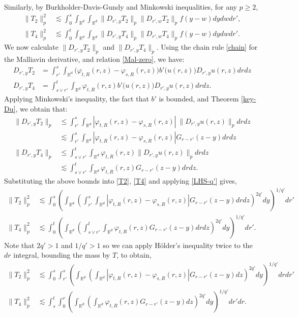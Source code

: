\documentclass[12pt]{article}
\def\bR{\mathbb{R}}
\newcommand{\les}{\lesssim}
\begin{document}
Similarly, by Burkholder-Davis-Gundy and Minkowski inequalities, for any $p\geq 2$,
\begin{align}
\label{T2}
\|T_2\|^2_p & \les \int_0^s \int_{\bR^d} \int_{\bR^d} \|D_{r',y} T_2\|_{p} \|D_{r',w} T_2\|_{p} f(y-w) dy dw dr', \\
\label{T4}
\|T_4\|^2_p & \les \int_0^t \int_{\bR^d} \int_{\bR^d} \|D_{r',y} T_4\|_{p} \|D_{r',w} T_4\|_{p} f(y-w) dy dw dr'. 
\end{align}
We now calculate $\|D_{r',y} T_2\|_{p}$ and $\|D_{r',y} T_4\|_{p}$. Using the chain rule \eqref{chain} for the Malliavin derivative, and relation \eqref{Mal-zero}, we have:
\begin{align*}
D_{r',y}T_2 &= \int_{r'}^s \int_{\bR^d}  \Big( \varphi_{t,R}(r,z) - \varphi_{s,R}(r,z) \Big) b'\big(u(r,z)\big) D_{r',y}u(r,z) drdz\\
D_{r',y}T_4&=\int_{s \vee r'}^t   \int_{\bR^d}  \varphi_{t,R}(r,z)  b'\big(u(r,z)\big) D_{r',y}u(r,z) drdz.
\end{align*}
Applying Minkowski's inequality, the fact that $b'$ is bounded, and Theorem \ref{key-Du}, we obtain that:
\begin{align*}
\|D_{r',y}T_2\|_{p} &\leq \int_{r'}^s \int_{\bR^d}  \left| \varphi_{t,R}(r,z) - \varphi_{s,R}(r,z) \right| \ \|D_{r',y}u(r,z)\|_{p}  drdz\\
&\les \int_{r'}^s  \int_{\bR^d}  \left| \varphi_{t,R}(r,z) - \varphi_{s,R}(r,z) \right| G_{r-r'}(z-y)  drdz\\
\|D_{r',y}T_4\|_p &\leq  \int_{s \vee r'}^t  \int_{\bR^d}  \varphi_{t,R}(r,z) \|D_{r',y}u(r,z)\|_{p} drdz \\
 &\les \int_{s \vee r'}^t \int_{\bR^d}  \varphi_{t,R}(r,z) G_{r-r'}(z-y) drdz. 
\end{align*}
Substituting the above bounds into \eqref{T2}, \eqref{T4} and applying \eqref{LHS-q'} gives, 
\begin{align*}
\|T_2\|^2_p & \les \int_0^s \left(\int_{\bR^d} \left( \int_{r'}^s \int_{\bR^d}  \left| \varphi_{t,R}(r,z) - \varphi_{s,R}(r,z) \right| G_{r-r'}(z-y)  drdz \right)^{2q'}  dy \right)^{1/q'}dr' \\
\|T_4\|^2_p & \les \int_0^t \left(\int_{\bR^d} \left( \int_{s \vee r'}^t \int_{\bR^d}  \varphi_{t,R}(r,z) G_{r-r'}(z-y)  drdz \right)^{2q'}  dy \right)^{1/q'}dr'.
\end{align*}
Note that $2q' > 1$ and $1/q' > 1$ so we can apply H\"older's inequality twice to the $dr$ integral, bounding the mass by $T$, to obtain, 
\begin{align*}
\|T_2\|^2_p & \les \int_0^s \int_{r'}^s \left(\int_{\bR^d} \left( \int_{\bR^d}  \left| \varphi_{t,R}(r,z) - \varphi_{s,R}(r,z) \right| G_{r-r'}(z-y)  dz \right)^{2q'}  dy \right)^{1/q'}drdr' \\
\|T_4\|^2_p & \les \int_s^t \int_{0}^r \left(\int_{\bR^d} \left(  \int_{\bR^d}   \varphi_{t,R}(r,z) G_{r-r'}(z-y)  dz \right)^{2q'}  dy \right)^{1/q'}dr'dr.
\end{align*}
\end{document}
